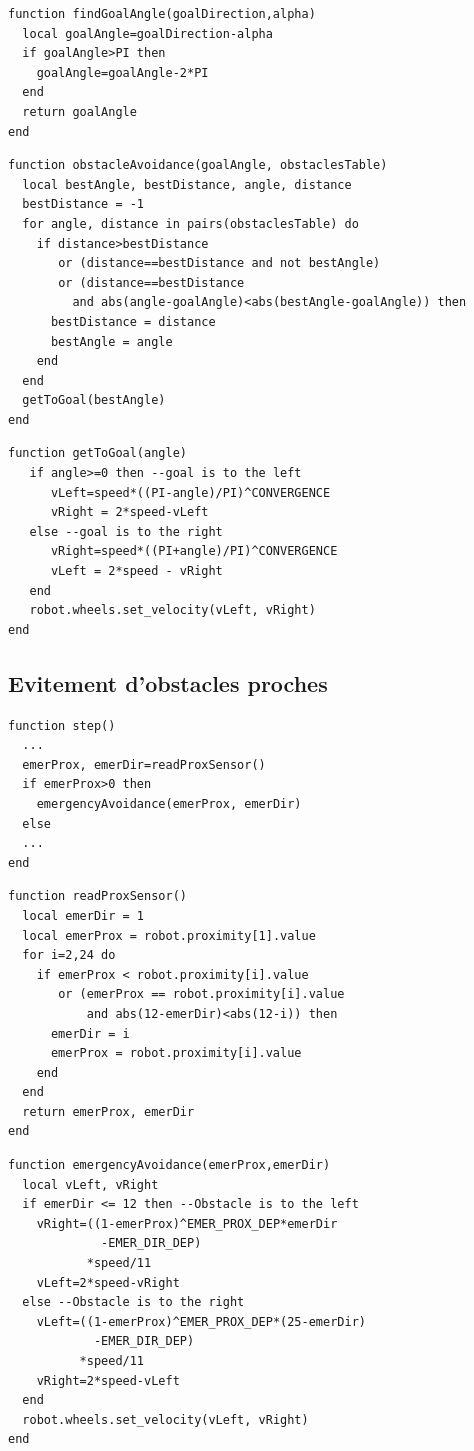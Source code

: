 \begin{subappendices}
\begin{lstlisting}[caption=Trouver la direction du goal vu du footbot]
function findGoalAngle(goalDirection,alpha)
  local goalAngle=goalDirection-alpha
  if goalAngle>PI then
    goalAngle=goalAngle-2*PI
  end
  return goalAngle
end  
  \end{lstlisting}
  \begin{lstlisting}[caption=Trouver la direction optimale et la suivre]
function obstacleAvoidance(goalAngle, obstaclesTable)
  local bestAngle, bestDistance, angle, distance
  bestDistance = -1
  for angle, distance in pairs(obstaclesTable) do
    if distance>bestDistance
       or (distance==bestDistance and not bestAngle)
       or (distance==bestDistance
         and abs(angle-goalAngle)<abs(bestAngle-goalAngle)) then
      bestDistance = distance
      bestAngle = angle
    end
  end
  getToGoal(bestAngle)
end
  \end{lstlisting}
  \begin{lstlisting}[caption=Fonction getToGoal]
function getToGoal(angle)
   if angle>=0 then --goal is to the left
      vLeft=speed*((PI-angle)/PI)^CONVERGENCE
      vRight = 2*speed-vLeft
   else --goal is to the right
      vRight=speed*((PI+angle)/PI)^CONVERGENCE
      vLeft = 2*speed - vRight
   end
   robot.wheels.set_velocity(vLeft, vRight)
end
  \end{lstlisting}
  \subsection{Evitement d'obstacles proches \label{app:implEvitClose}}
  \begin{lstlisting}[caption=Capteur supplémentaire]
function step()
  ...
  emerProx, emerDir=readProxSensor()
  if emerProx>0 then
    emergencyAvoidance(emerProx, emerDir)
  else
  ...
end    
  \end{lstlisting}
  \begin{lstlisting}[caption=lecture du \emph{proximity sensor}]
function readProxSensor()
  local emerDir = 1
  local emerProx = robot.proximity[1].value
  for i=2,24 do
    if emerProx < robot.proximity[i].value
       or (emerProx == robot.proximity[i].value
           and abs(12-emerDir)<abs(12-i)) then
      emerDir = i
      emerProx = robot.proximity[i].value
    end
  end
  return emerProx, emerDir
end
  \end{lstlisting}

  \begin{lstlisting}[caption=Fonction emergencyAvoidance]
function emergencyAvoidance(emerProx,emerDir)
  local vLeft, vRight
  if emerDir <= 12 then --Obstacle is to the left
    vRight=((1-emerProx)^EMER_PROX_DEP*emerDir
             -EMER_DIR_DEP)
           *speed/11
    vLeft=2*speed-vRight
  else --Obstacle is to the right
    vLeft=((1-emerProx)^EMER_PROX_DEP*(25-emerDir)
            -EMER_DIR_DEP)
          *speed/11
    vRight=2*speed-vLeft
  end
  robot.wheels.set_velocity(vLeft, vRight)
end    
  \end{lstlisting}

\end{subappendices}
